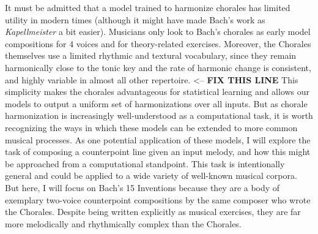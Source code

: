 \documentclass[11pt]{article}
\begin{document}
It must be admitted that a model trained to harmonize chorales has limited utility in modern times (although it might have made Bach's work as \textit{Kapellmeister} a bit easier). Musicians only look to Bach's chorales as early model compositions for 4 voices and for theory-related exercises. Moreover, the Chorales themselves use a limited rhythmic and textural vocabulary, since they remain harmonically close to the tonic key and the rate of harmonic change is consistent, and highly variable in almost all other repertoire. <-- \textbf{FIX THIS LINE} This simplicity makes the chorales advantageous for statistical learning and allows our models to output a uniform set of harmonizations over all inputs. But as chorale harmonization is increasingly well-understood as a computational task, it is worth recognizing the ways in which these models can be extended to more common musical processes. As one potential application of these models, I will explore the task of composing a counterpoint line given an input melody, and how this might be approached from a computational standpoint. This task is intentionally general and could be applied to a wide variety of well-known musical corpora. But here, I will focus on Bach's 15 Inventions because they are a body of exemplary two-voice counterpoint compositions by the same composer who wrote the Chorales. Despite being written explicitly as musical exercises, they are far more melodically and rhythmically complex than the Chorales.
\end{document}
